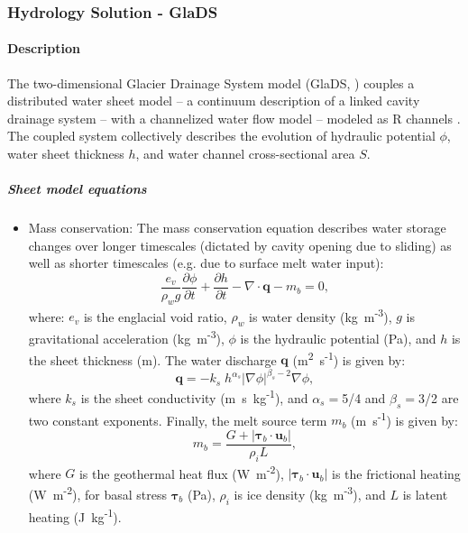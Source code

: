 
\subsubsection{Hydrology Solution - GlaDS} \label{sec:using-issm-capabilities-hydrology-glads}
\paragraph{Description}
The two-dimensional Glacier Drainage System model (GlaDS, \cite{Werder2013}) couples a distributed water sheet model -- a continuum description of a linked cavity drainage system \citep{Hewitt2011} -- with a channelized water flow model -- modeled as R channels \citep{Rothlisberger1972,Nye1976}. The coupled system collectively describes the evolution of hydraulic potential $\phi$, water sheet thickness $h$, and water channel cross-sectional area $S$. 

\subparagraph{Sheet model equations}
\begin{itemize}
	\item Mass conservation: The mass conservation equation describes water storage changes over longer timescales (dictated by cavity opening due to sliding) as well as shorter timescales (e.g. due to surface melt water input):
	\begin{equation}
		\frac{e_v}{\rho_w g}\frac{\partial\phi}{\partial t} + \frac{\partial h}{\partial t} - \nabla\cdot\boldsymbol{q} - m_b = 0,
	\end{equation}
	where: $e_v$ is the englacial void ratio, $\rho_w$ is water density (kg~m\textsuperscript{-3}), $g$ is gravitational acceleration (kg~m\textsuperscript{-3}), $\phi$ is the hydraulic potential (Pa), and $h$ is the sheet thickness (m). The water discharge $\boldsymbol{q}$ (m\textsuperscript{2}~s\textsuperscript{-1}) is given by:
	\begin{equation}
		\boldsymbol{q}=-k_s\;h^{\alpha_s}\left|\nabla\phi\right|^{\beta_s-2}\nabla\phi,
	\end{equation}
	where $k_s$ is the sheet conductivity (m~s~kg\textsuperscript{-1}), and $\alpha_s$$=$5/4 and $\beta_s$$=$3/2 are two constant exponents. Finally, the melt source term $m_b$ (m~s\textsuperscript{-1}) is given by:
	\begin{equation}
		m_b=\frac{G+|\boldsymbol{\tau}_b\cdot\boldsymbol{u}_b|}{\rho_{i}L},
	\end{equation}
	where $G$ is the geothermal heat flux (W~m\textsuperscript{-2}), $|\boldsymbol{\tau}_b\cdot\boldsymbol{u}_b|$ is the frictional heating (W~m\textsuperscript{-2}), for basal stress $\boldsymbol{\tau}_b$ (Pa), $\rho_i$ is ice density (kg~m\textsuperscript{-3}), and $L$ is latent heating (J~kg\textsuperscript{-1}).
\end{itemize}

